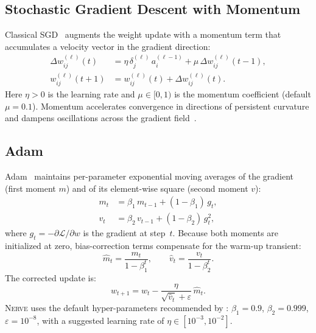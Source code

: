 \documentclass[11pt,a4paper]{article}
\newcommand{\nerve}{\textsc{Nerve}}
\begin{document}
\subsection{Stochastic Gradient Descent with Momentum}

Classical SGD~\cite{rumelhart1986} augments the weight update with a momentum
term that accumulates a velocity vector in the gradient direction:
\begin{align}
  \Delta w_{ij}^{(\ell)}(t)
    &= \eta\,\delta_j^{(\ell)}\,a_i^{(\ell-1)}
       + \mu\,\Delta w_{ij}^{(\ell)}(t-1),
  \label{eq:sgd-delta}\\
  w_{ij}^{(\ell)}(t+1)
    &= w_{ij}^{(\ell)}(t) + \Delta w_{ij}^{(\ell)}(t).
  \label{eq:sgd-update}
\end{align}
Here $\eta > 0$ is the learning rate and $\mu \in [0,1)$ is the momentum
coefficient (default $\mu = 0.1$). Momentum accelerates convergence in
directions of persistent curvature and dampens oscillations across the gradient
field~\cite{lecun1998}.

\subsection{Adam}
\label{sec:adam}

Adam~\cite{kingma2015} maintains per-parameter exponential moving averages
of the gradient (first moment $m$) and of its element-wise square (second
moment $v$):
\begin{align}
  m_t &= \beta_1\,m_{t-1} + (1-\beta_1)\,g_t, \label{eq:adam-m}\\
  v_t &= \beta_2\,v_{t-1} + (1-\beta_2)\,g_t^2, \label{eq:adam-v}
\end{align}
where $g_t = -\partial\mathcal{L}/\partial w$ is the gradient at step~$t$.
Because both moments are initialized at zero, bias-correction terms
compensate for the warm-up transient:
\begin{equation}
  \hat{m}_t = \frac{m_t}{1-\beta_1^t},\qquad
  \hat{v}_t = \frac{v_t}{1-\beta_2^t}.
  \label{eq:adam-bias}
\end{equation}
The corrected update is:
\begin{equation}
  w_{t+1} = w_t - \frac{\eta}{\sqrt{\hat{v}_t}+\varepsilon}\,\hat{m}_t.
  \label{eq:adam-update}
\end{equation}
\nerve{} uses the default hyper-parameters recommended by \citeauthor{kingma2015}:
$\beta_1=0.9$, $\beta_2=0.999$, $\varepsilon=10^{-8}$, with a suggested
learning rate of $\eta \in [10^{-3}, 10^{-2}]$.
\end{document}

